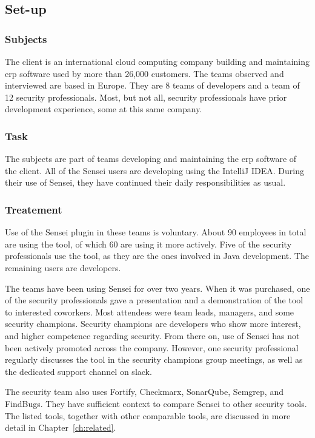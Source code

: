 \subsection{Set-up}

\subsubsection{Subjects}
The client is an international cloud computing company building and maintaining \gls{erp} software used by more than 26,000 customers.
The teams observed and interviewed are based in Europe.
They are 8 teams of developers and a team of 12 security professionals.
Most, but not all, security professionals have prior development experience, some at this same company.

\subsubsection{Task}
The subjects are part of teams developing and maintaining the \gls{erp} software of the client.
All of the Sensei users are developing using the IntelliJ IDEA.
During their use of Sensei, they have continued their daily responsibilities as usual.

\subsubsection{Treatement}
Use of the Sensei plugin in these teams is voluntary.
About 90 employees in total are using the tool, of which 60 are using it more actively.
Five of the security professionals use the tool, as they are the ones involved in Java development.
The remaining users are developers.

The teams have been using Sensei for over two years.
When it was purchased, one of the security professionals gave a presentation and a demonstration of the tool to interested coworkers.
Most attendees were team leads, managers, and some security champions.
Security champions are developers who show more interest, and higher competence regarding security.
From there on, use of Sensei has not been actively promoted across the company.
However, one security professional regularly discusses the tool in the security champions group meetings, as well as the dedicated support channel on \gls{slack}.

The security team also uses Fortify, Checkmarx, SonarQube, Semgrep, and FindBugs.
They have sufficient context to compare Sensei to other security tools.
The listed tools, together with other comparable tools, are discussed in more detail in Chapter~\ref{ch:related}.

